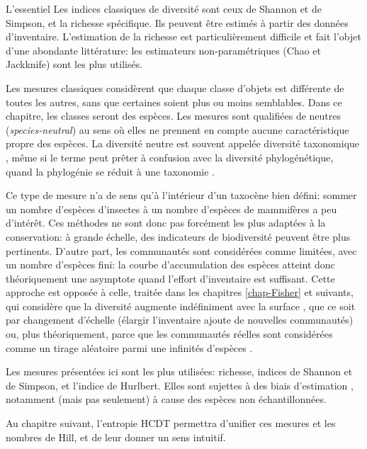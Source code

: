 \documentclass[
  11pt,
  french,
  a4paper,
  extrafontsizes,onecolumn,openright
  ]{memoir}
\newenvironment{Summary}
  {\begin{bclogo}[logo=\bctrombone, noborder=true, couleur=lightgray!50]{L'essentiel}\parindent0pt}
  {\end{bclogo}}
\newlength{\rf}
\begin{document}
\begin{Summary}
Les indices classiques de diversité sont ceux de Shannon et de Simpson, et la richesse spécifique.
Ils peuvent être estimés à partir des données d'inventaire.
L'estimation de la richesse est particulièrement difficile et fait l'objet d'une abondante littérature: les estimateurs non-paramétriques (Chao et Jackknife) sont les plus utilisés.

\end{Summary}

Les mesures classiques \autocite{Peet1974} considèrent que chaque classe d'objets est différente de toutes les autres, sans que certaines soient plus ou moins semblables.
Dans ce chapitre, les classes seront des espèces.
Les mesures sont qualifiées de neutres (\emph{species-neutral}) au sens où elles ne prennent en compte aucune caractéristique propre des espèces.
La diversité neutre est souvent appelée diversité taxonomique \autocite{Devictor2010,Stegen2011}, même si le terme peut prêter à confusion avec la diversité phylogénétique, quand la phylogénie se réduit à une taxonomie \autocite{Clarke2001,Ricotta2003c}.

Ce type de mesure n'a de sens qu'à l'intérieur d'un taxocène bien défini: sommer un nombre d'espèces d'insectes à un nombre d'espèces de mammifères a peu d'intérêt.
Ces méthodes ne sont donc pas forcément les plus adaptées à la conservation: à grande échelle, des indicateurs de biodiversité \autocite{Balmford2003} peuvent être plus pertinents.
D'autre part, les communautés sont considérées comme limitées, avec un nombre d'espèces fini: la courbe d'accumulation des espèces atteint donc théoriquement une asymptote quand l'effort d'inventaire est suffisant.
Cette approche est opposée à celle, traitée dans les chapitres \ref{chap-Fisher} et suivants, qui considère que la diversité augmente indéfiniment avec la surface \autocite{Williamson2001}, que ce soit par changement d'échelle (élargir l'inventaire ajoute de nouvelles communautés) ou, plus théoriquement, parce que les communautés réelles sont considérées comme un tirage aléatoire parmi une infinités d'espèces \autocite{Fisher1943}.

Les mesures présentées ici sont les plus utilisées: richesse, indices de Shannon et de Simpson, et l'indice de Hurlbert.
Elles sont sujettes à des biais d'estimation \autocite{Mouillot1999}, notamment (mais pas seulement) à cause des espèces non échantillonnées.

Au chapitre suivant, l'entropie HCDT permettra d'unifier ces mesures et les nombres de Hill, et de leur donner un sens intuitif.
\end{document}
